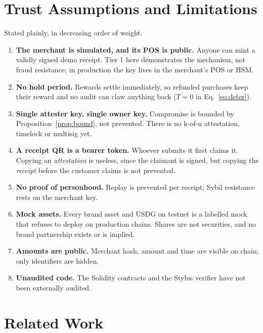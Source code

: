 \documentclass[10.5pt,letterpaper]{article}
\theoremstyle{definition}
\theoremstyle{remark}
\begin{document}
\section{Trust Assumptions and Limitations}\label{sec:limits}

Stated plainly, in decreasing order of weight.
\begin{enumerate}[leftmargin=*]
  \item \textbf{The merchant is simulated, and its POS is public.} Anyone can mint a validly signed demo receipt. Tier 1 here
        demonstrates the mechanism, not fraud resistance; in production the key lives in the merchant's POS or HSM.
  \item \textbf{No hold period.} Rewards settle immediately, so refunded purchases keep their reward and no audit can claw anything
        back ($T=0$ in Eq.~\ref{eq:deter}).
  \item \textbf{Single attester key, single owner key.} Compromise is bounded by Proposition~\ref{prop:bound}, not prevented. There is no
        k-of-n attestation, timelock or multisig yet.
  \item \textbf{A receipt QR is a bearer token.} Whoever submits it first claims it. Copying an \emph{attestation} is useless, since the
        claimant is signed, but copying the \emph{receipt} before the customer claims is not prevented.
  \item \textbf{No proof of personhood.} Replay is prevented per receipt; Sybil resistance rests on the merchant key.
  \item \textbf{Mock assets.} Every brand asset and USDG on testnet is a labelled mock that refuses to deploy on production
        chains. Shares are not securities, and no brand partnership exists or is implied.
  \item \textbf{Amounts are public.} Merchant hash, amount and time are visible on chain; only identifiers are hidden.
  \item \textbf{Unaudited code.} The Solidity contracts and the Stylus verifier have not been externally audited.
\end{enumerate}

\section{Related Work}
\end{document}
